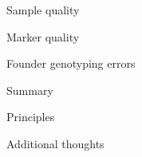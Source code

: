 \documentclass[aspectratio=169,12pt,t]{beamer}
\begin{document}
\begin{frame}[c]{}

\centerline{\Large \color{title} Sample quality}

\note{
}

\end{frame}













\begin{frame}[c]{}

\centerline{\Large \color{title} Marker quality}

\note{
}

\end{frame}










\begin{frame}[c]{}

\centerline{\Large \color{title} Founder genotyping errors}

\note{
}

\end{frame}





\begin{frame}[c]{Summary}

\note{
}

\end{frame}



\begin{frame}[c]{Principles}

\note{
}

\end{frame}



\begin{frame}[c]{Additional thoughts}

\note{
}

\end{frame}
\end{document}
